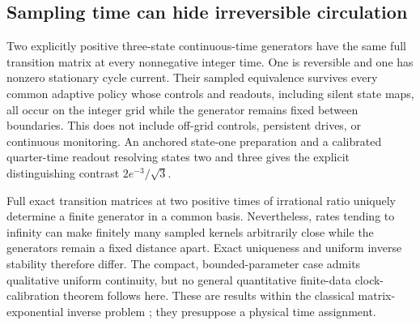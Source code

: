 \subsection{Sampling time can hide irreversible circulation}

Two explicitly positive three-state continuous-time generators have
the same full transition matrix at every nonnegative integer time.
One is reversible and one has nonzero stationary cycle current.
Their sampled equivalence survives every common adaptive policy whose
controls and readouts, including silent state maps, all occur on the
integer grid while the generator remains fixed between boundaries.
This does not include off-grid controls, persistent drives, or
continuous monitoring.
An anchored state-one preparation and a calibrated quarter-time readout
resolving states two and three gives the explicit distinguishing
contrast \(2e^{-3}/\sqrt3\).

Full exact transition matrices at two positive times of irrational ratio
uniquely determine a finite generator in a common basis.
Nevertheless, rates tending to infinity can make finitely many sampled
kernels arbitrarily close while the generators remain a fixed distance
apart.  Exact uniqueness and uniform inverse stability therefore differ.
The compact, bounded-parameter case admits qualitative uniform
continuity, but no general quantitative finite-data clock-calibration
theorem follows here.  These are results within the classical
matrix-exponential inverse problem \cite{op:baake,op:yue}; they
presuppose a physical time assignment.
